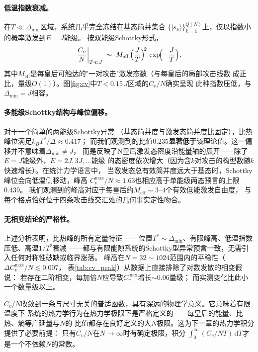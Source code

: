 \paragraph{低温指数衰减。}在$T\ll\Delta_{\min}$区域，系统几乎完全冻结在基态简并集合
$\{|s_{k}\rangle\}_{k=1}^{Q(N)}$上，仅以指数小的概率激发到$E=J$能级。
按双能级Schottky形式，
%
\begin{equation}
  \frac{C_{v}}{N}\bigg|_{T\ll J}
  \;\sim\; M_{\text{eff}}\,\Bigl(\frac{J}{T}\Bigr)^{\!2}\,
            \exp\!\Bigl(-\frac{J}{T}\Bigr),
  \label{eq:lowT}
\end{equation}
%
其中$M_{\text{eff}}$是每皇后可触达的"一对攻击"激发态数（与每皇后的局部攻击线数
成正比，量级$O(1)$）。图\ref{fig:cv}中$T<0.15\,J$区域的$C_{v}/N$确实呈现
此种指数压低，与$\Delta_{\min}=J$相容。

\paragraph{多能级Schottky结构与峰位偏移。}对于一个简单的两能级Schottky异常
（基态简并度与激发态简并度比固定），比热峰位满足$k_{B}T^{\ast}/\Delta\approx 0.417$；
而我们观测到的比值$0.235$\textbf{显著低于}该理论值。这一偏移并不意味着$\Delta_{\min}\ne J$，
而是反映了N皇后激发态密度沿能量轴的展开——除了$E=J$能级外，$E=2J,3J,\ldots$能级
的态密度依次增大（因为含$k$对攻击的构型数随$k$快速增长）。在统计力学语言中，
当激发态总有效简并度远大于基态时，Schottky峰位会向低温侧移动，峰高
$C_{v}^{\max}/N\approx 1.63$也相应高于单能级两态预言的上限$0.439$。
我们观测到的峰高对应于每皇后约$M_{\text{eff}}\sim 3\text{--}4$个有效低能激发自由度，
与每个格点恰好位于四条攻击线交汇处的几何事实定性吻合。

\paragraph{无相变结论的严格性。}上述分析表明，比热峰的所有定量特征
——位置$T^{\ast}\sim\Delta_{\min}$、有限峰高、低温指数压低、高温$1/T^{2}$衰减
——都与有限能隙系统的Schottky型异常预言一致，无需引入任何对称性破缺或临界涨落。
峰高在$N=32\sim 1024$范围内的平稳性（$\Delta C_{v}^{\max}/N\lesssim 0.007$，
表\ref{tab:cv_peak}）从数据上直接排除了对数发散的相变假说：
若存在二阶相变，每加倍$N$应导致$C_{v}^{\max}$增长$\sim 0.06$量级；
而实测变化比此小一个数量级以上。


$C_{v}/N$收敛到一条与尺寸无关的普适函数，具有深远的物理学意义。它意味着有限温度下
系统的热力学行为在热力学极限下是严格定义的——每皇后的能量、比热、熵等广延量与$N$的
比值都存在良好定义的大$N$极限。这为下一章的热力学积分提供了必要前提：
只有$C_{v}/N$在$N\to\infty$时有确定极限，积分
$\int_{0}^{\infty}(C_{v}/NT)\,\mathrm{d}T$才是一个不依赖$N$的常数。
